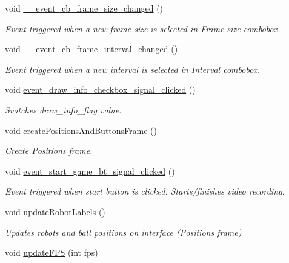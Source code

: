 \begin{DoxyCompactItemize}
void \hyperlink{class_v_s_s_s___g_u_i_1_1_v4_l_interface_a49e6f69de18f2bcb54db964375535e9f}{\+\_\+\+\_\+event\+\_\+cb\+\_\+frame\+\_\+size\+\_\+changed} ()
\begin{DoxyCompactList}\small\item\em Event triggered when a new frame size is selected in Frame size combobox. \end{DoxyCompactList}\item 
void \hyperlink{class_v_s_s_s___g_u_i_1_1_v4_l_interface_ad78e73dabab1c7caa41a45c363eef205}{\+\_\+\+\_\+event\+\_\+cb\+\_\+frame\+\_\+interval\+\_\+changed} ()
\begin{DoxyCompactList}\small\item\em Event triggered when a new interval is selected in Interval combobox. \end{DoxyCompactList}\item 
void \hyperlink{class_v_s_s_s___g_u_i_1_1_v4_l_interface_a29d936ec76ebfc352060d13957255c0a}{event\+\_\+draw\+\_\+info\+\_\+checkbox\+\_\+signal\+\_\+clicked} ()
\begin{DoxyCompactList}\small\item\em Switches draw\+\_\+info\+\_\+flag value. \end{DoxyCompactList}\item 
void \hyperlink{class_v_s_s_s___g_u_i_1_1_v4_l_interface_ab9798615f93d2e1272a10891e7d57219}{create\+Positions\+And\+Buttons\+Frame} ()
\begin{DoxyCompactList}\small\item\em Create Positions frame. \end{DoxyCompactList}\item 
void \hyperlink{class_v_s_s_s___g_u_i_1_1_v4_l_interface_a8c3f91048adebeb0b5aa9838053cdcfe}{event\+\_\+start\+\_\+game\+\_\+bt\+\_\+signal\+\_\+clicked} ()
\begin{DoxyCompactList}\small\item\em Event triggered when start button is clicked. Starts/finishes video recording. \end{DoxyCompactList}\item 
void \hyperlink{class_v_s_s_s___g_u_i_1_1_v4_l_interface_a32c034643a07b5354ad50541413ff08d}{update\+Robot\+Labels} ()
\begin{DoxyCompactList}\small\item\em Updates robots and ball positions on interface (Positions frame) \end{DoxyCompactList}\item 
void \hyperlink{class_v_s_s_s___g_u_i_1_1_v4_l_interface_a13330b40a7cbd68c2ed4a244f0726810}{update\+F\+PS} (int fps)

\end{DoxyCompactItemize}
